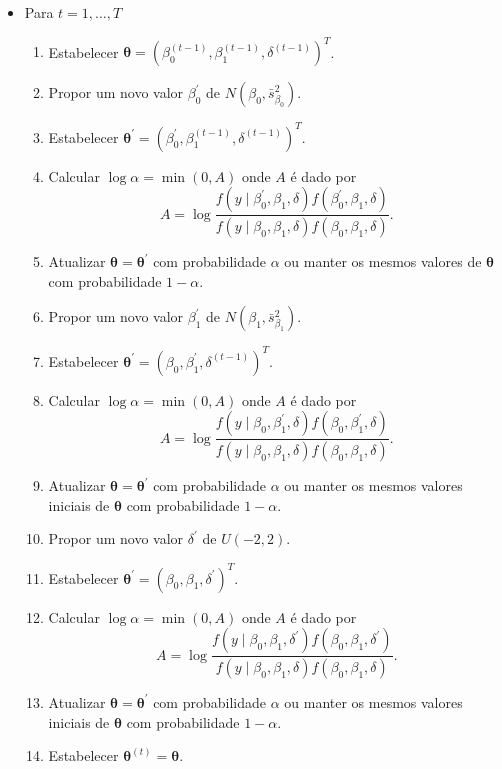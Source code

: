 \begin{itemize}
\item Para $t=1,\ldots,T$	
	\begin{enumerate}
		\item Estabelecer $\bm{\theta}=\left(\beta_{0}^{\left(t-1\right)},\beta_{1}^{\left(t-1\right)},\delta^{\left(t-1\right)}\right)^{T}$.
		\item Propor um novo valor $\beta_{0}^{'}$ de $N\left(\beta_{0},\bar{s}_{\beta_{0}}^{2}\right)$.
		\item Estabelecer $\bm{\theta^{'}}=\left(\beta_{0}^{'},\beta_{1}^{\left(t-1\right)},\delta^{\left(t-1\right)}\right)^{T}$.
		\item Calcular $\log\alpha=\min\left(0,A\right)$ onde $A$ é dado por
		$$A=\log\frac{f\left(y\mid\beta_{0}^{'},\beta_{1},\delta\right)f\left(\beta_{0}^{'},\beta_{1},\delta\right)}{f\left(y\mid\beta_{0},\beta_{1},\delta\right)f\left(\beta_{0},\beta_{1},\delta\right)}.$$
		\item Atualizar $\bm{\theta}=\bm{\theta^{'}}$ com probabilidade $\alpha$ ou manter os mesmos valores de $\bm{\theta}$ com probabilidade $1-\alpha$.
		\item Propor um novo valor $\beta_{1}^{'}$ de $N\left(\beta_{1},\bar{s}_{\beta_{1}}^{2}\right)$.
		\item Estabelecer $\bm{\theta^{'}}=\left(\beta_{0},\beta_{1}^{'},\delta^{\left(t-1\right)}\right)^{T}$.
		\item  Calcular $\log\alpha=\min\left(0,A\right)$ onde $A$ é dado por
		$$A=\log\frac{f\left(y\mid\beta_{0},\beta_{1}^{'},\delta\right)f\left(\beta_{0},\beta_{1}^{'},\delta\right)}{f\left(y\mid\beta_{0},\beta_{1},\delta\right)f\left(\beta_{0},\beta_{1},\delta\right)}.$$
		\item  Atualizar $\bm{\theta}=\bm{\theta^{'}}$ com probabilidade $\alpha$ ou manter os mesmos valores iniciais de $\bm{\theta}$ com probabilidade $1-\alpha$.
		\item Propor um novo valor $\delta^{'}$ de $U(-2,2)$.
		\item Estabelecer $\bm{\theta^{'}}=\left(\beta_{0},\beta_{1},\delta^{'}\right)^{T}$.
		\item  Calcular $\log\alpha=\min\left(0,A\right)$ onde $A$ é dado por
		$$A=\log\frac{f\left(y\mid\beta_{0},\beta_{1},\delta^{'}\right)f\left(\beta_{0},\beta_{1},\delta^{'}\right)}{f\left(y\mid\beta_{0},\beta_{1},\delta\right)f\left(\beta_{0},\beta_{1},\delta\right)}.$$
		\item  Atualizar $\bm{\theta}=\bm{\theta^{'}}$ com probabilidade $\alpha$ ou manter os mesmos valores iniciais de $\bm{\theta}$ com probabilidade $1-\alpha$.
		\item Estabelecer $\bm{\theta}^{\left(t\right)}=\bm{\theta}$.
	\end{enumerate}
\end{itemize}
	
